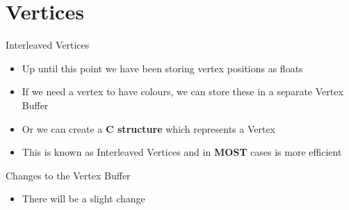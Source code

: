 \part{Vertices}
\frame{\partpage}

\begin{frame}{Interleaved Vertices}
	\begin{itemize}
		\item Up until this point we have been storing vertex positions as floats
		\item If we need a vertex to have colours, we can store these in a separate Vertex Buffer
		\item Or we can create a \textbf{C structure} which represents a Vertex
		\item This is known as Interleaved Vertices and in \textbf{MOST} cases is more efficient
	\end{itemize}
\end{frame}

\begin{frame}}[fragile]{Vertex Structure 1}
	\begin{lstlisting}
		struct Vertex
		{
			float x,y,z;
		};
	\end{lstlisting}
\end{frame}

\begin{frame}}[fragile]{Vertex Structure 2}
	\begin{lstlisting}
		struct Vertex
		{
			float x,y,z;
			float r,g,b,a;
		};
	\end{lstlisting}
\end{frame}

\begin{frame}{Changes to the Vertex Buffer}
	\begin{itemize}
		\item There will be a slight change 
	\end{itemize}
\end{frame}
